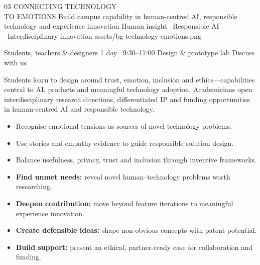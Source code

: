 \WorkshopHeader
  {03}
  {CONNECTING TECHNOLOGY\\TO EMOTIONS}
  {Build campus capability in human-centred AI, responsible technology and experience innovation}
  {Human insight \textbullet\ Responsible AI \textbullet\ Interdisciplinary innovation}
  {\faHeart}
  {assets/bg-technology-emotions.png}

\MetaStrip
  {Students, teachers \& designers}
  {1 day \textbar\ 9:30--17:00}
  {Design \& prototype lab}
  {Discuss with us}

\begin{minipage}[t]{0.615\textwidth}
  \vspace{0pt}
  \begin{brochurecard}[colback=Accent!3!white]
    \WhyItMatters
      {Students learn to design around trust, emotion, inclusion and ethics---capabilities central to AI, products and meaningful technology adoption.}
      {Academicians open interdisciplinary research directions, differentiated IP and funding opportunities in human-centred AI and responsible technology.}
  \end{brochurecard}

  \begin{brochurecard}
    \begin{minipage}[t]{0.485\linewidth}
      \begin{itemize}
        \item Recognise emotional tensions as sources of novel technology problems.
        \item Use stories and empathy evidence to guide responsible solution design.
        \item Balance usefulness, privacy, trust and inclusion through inventive frameworks.
      \end{itemize}
    \end{minipage}\hfill
    \begin{minipage}[t]{0.485\linewidth}
      \begin{itemize}
        \item \textbf{Find unmet needs:} reveal novel human--technology problems worth researching.
        \item \textbf{Deepen contribution:} move beyond feature iterations to meaningful experience innovation.
        \item \textbf{Create defensible ideas:} shape non-obvious concepts with patent potential.
        \item \textbf{Build support:} present an ethical, partner-ready case for collaboration and funding.
      \end{itemize}
    \end{minipage}
  \end{brochurecard}


\end{minipage}
